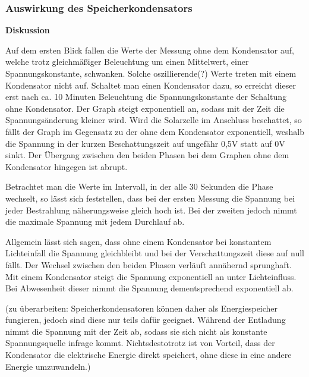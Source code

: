     \subsubsection{Auswirkung des Speicherkondensators}                 %
        \textbf{Diskussion}
        \newline
        \par Auf dem ersten Blick fallen die Werte der Messung ohne dem Kondensator auf, welche trotz gleichmäßiger Beleuchtung um einen Mittelwert, einer Spannungskonstante, schwanken. Solche oszillierende(?) Werte treten mit einem Kondensator nicht auf. Schaltet man einen Kondensator dazu, so erreicht dieser erst nach ca. 10 Minuten Beleuchtung die Spannungskonstante der Schaltung ohne Kondensator. Der Graph steigt exponentiell an, sodass mit der Zeit die Spannungsänderung kleiner wird. Wird die Solarzelle im Anschluss beschattet, so fällt der Graph im Gegensatz zu der ohne dem Kondensator exponentiell, weshalb die Spannung in der kurzen Beschattungszeit auf ungefähr 0,5V statt auf 0V sinkt. Der Übergang zwischen den beiden Phasen bei dem Graphen ohne dem Kondensator hingegen ist abrupt.
        \par Betrachtet man die Werte im Intervall, in der alle 30 Sekunden die Phase wechselt, so lässt sich feststellen, dass bei der ersten Messung die Spannung bei jeder Bestrahlung näherungsweise gleich hoch ist. Bei der zweiten jedoch nimmt die maximale Spannung mit jedem Durchlauf ab. 
        \par Allgemein lässt sich sagen, dass ohne einem Kondensator bei konstantem Lichteinfall die Spannung gleichbleibt und bei der Verschattungszeit diese auf null fällt. Der Wechsel zwischen den beiden Phasen verläuft annähernd sprunghaft. Mit einem Kondensator steigt die Spannung exponentiell an unter Lichteinfluss. Bei Abwesenheit dieser nimmt die Spannung dementsprechend exponentiell ab.
        
        
        
        
        
        \par (zu überarbeiten: Speicherkondensatoren können daher als Energiespeicher fungieren, jedoch sind diese nur teils dafür geeignet. Während der Entladung nimmt die Spannung mit der Zeit ab, sodass sie sich nicht als konstante Spannungsquelle infrage kommt.
        Nichtsdestotrotz ist von Vorteil, dass der Kondensator die elektrische Energie direkt speichert, ohne diese in eine andere Energie umzuwandeln.)

